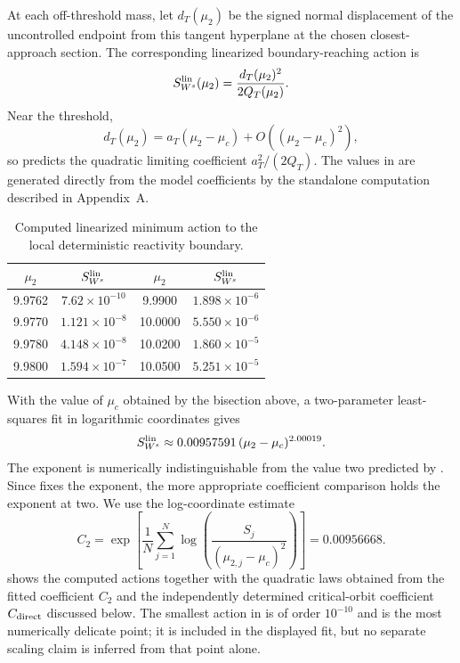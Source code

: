 \documentclass[11pt]{article}
\theoremstyle{definition}
\theoremstyle{remark}
\begin{document}
At each off-threshold mass, let $d_T(\mu_2)$ be the signed normal displacement of the uncontrolled endpoint from this tangent hyperplane at the chosen closest-approach section.  The corresponding linearized boundary-reaching action is
\begin{equation}
S_{W^s}^{\rm lin}(\mu_2)
=
\frac{d_T(\mu_2)^2}{2Q_T(\mu_2)}.
\label{eq:SWs-lin-def}
\end{equation}
Near the threshold,
\[
d_T(\mu_2)=a_T(\mu_2-\mu_c)+O((\mu_2-\mu_c)^2),
\]
so  predicts the quadratic limiting coefficient $a_T^2/(2Q_T)$.  The values in  are generated directly from the model coefficients by the standalone computation described in Appendix~A.
\begin{table}[htbp]
\centering
\caption{Computed linearized minimum action to the local deterministic reactivity boundary.}
\label{tab:stable-action}
\begin{tabular}{cc@{\qquad}cc}
\toprule
$\mu_2$ & $S_{W^s}^{\rm lin}$ & $\mu_2$ & $S_{W^s}^{\rm lin}$\\
\midrule
9.9762 & $7.62\times10^{-10}$ & 9.9900 & $1.898\times10^{-6}$\\
9.9770 & $1.121\times10^{-8}$ & 10.0000 & $5.550\times10^{-6}$\\
9.9780 & $4.148\times10^{-8}$ & 10.0200 & $1.860\times10^{-5}$\\
9.9800 & $1.594\times10^{-7}$ & 10.0500 & $5.251\times10^{-5}$\\
\bottomrule
\end{tabular}
\end{table}
With the value of $\mu_c$ obtained by the bisection above, a two-parameter least-squares fit in logarithmic coordinates gives
\begin{equation}
S_{W^s}^{\rm lin}
\approx0.00957591\,(\mu_2-\mu_c)^{2.00019}.
\label{eq:solvent-free-fit}
\end{equation}
The exponent is numerically indistinguishable from the value two predicted by .  Since  fixes the exponent, the more appropriate coefficient comparison holds the exponent at two.  We use the log-coordinate estimate
\begin{equation}
C_2
=\exp\left[
\frac1N\sum_{j=1}^{N}
\log\left(\frac{S_j}{(\mu_{2,j}-\mu_c)^2}\right)
\right]
=0.00956668.
\label{eq:solvent-fixed-fit}
\end{equation}
 shows the computed actions together with the quadratic laws obtained from the fitted coefficient $C_2$ and the independently determined critical-orbit coefficient $C_{\rm direct}$ discussed below.
The smallest action in  is of order $10^{-10}$ and is the most numerically delicate point; it is included in the displayed fit, but no separate scaling claim is inferred from that point alone.
\end{document}
